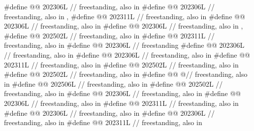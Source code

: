 \begin{codeblock}
#define @@             202306L // freestanding, also in 
#define @@              202306L // freestanding, also in , 
#define @@              202311L // freestanding, also in 
#define @@               202306L // freestanding, also in 
#define @@                 202306L
  // freestanding, also in , 
#define @@            202502L // freestanding, also in 
#define @@             202311L // freestanding, also in 
#define @@  202306L // freestanding
#define @@           202306L // freestanding, also in 
#define @@             202306L // freestanding, also in 
#define @@               202311L // freestanding, also in 
#define @@               202502L // freestanding, also in 
#define @@              202502L // freestanding, also in 
#define @@         @\seebelow@ // freestanding, also in 
#define @@             202506L // freestanding, also in 
#define @@               202502L // freestanding, also in 
#define @@               202306L // freestanding, also in 
#define @@                202306L // freestanding, also in 
#define @@          202311L // freestanding, also in 
#define @@                202306L // freestanding, also in 
#define @@              202306L // freestanding, also in 
#define @@              202311L // freestanding, also in 

\end{codeblock}
